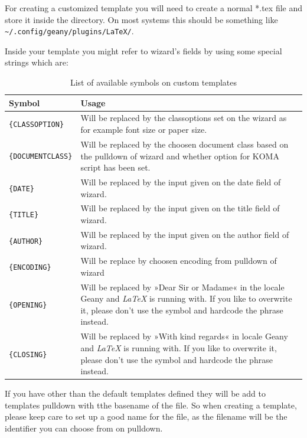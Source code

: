 \documentclass[%
paper=a4,%
fontsize=11pt,%
twoside=false,%
DIV18,%
headsepline,%
plainheadsepline,%
footsepline,%
plainfootsepline,%
bibliography=totoc,%
listof=totoc,%
BCOR10mm,%
parskip=half,%
openany,%
]{scrreprt}
\begin{document}
For creating a customized template you will need to create a normal
*.tex file and store it inside the directory. On most systems this
should be something like
\texttt{\textasciitilde/.config/geany/plugins/LaTeX/}.

Inside your template you might refer to wizard's fields by using some
special strings which are:

\begin{table}[H]
\centering
\label{tab:symbols_in_custom_templates}
\caption{List of available symbols on custom templates}
\begin{tabular}{l|p{10cm}}
\textbf{Symbol} & \textbf{Usage}\\ \hline
\texttt{\{CLASSOPTION\}} & Will be replaced by the classoptions set on
    the wizard as for example font size or paper size.\\
\texttt{\{DOCUMENTCLASS\}} & Will be replaced by the choosen document
    class based on the pulldown of wizard and whether option for KOMA
    script has been set. \\
\texttt{\{DATE\}} & Will be replaced by the input given on the date
    field of wizard.\\
\texttt{\{TITLE\}} & Will be replaced by the input given on the title
    field of wizard.\\
\texttt{\{AUTHOR\} }& Will be replaced by the input given on the author
    field of wizard.\\
\texttt{\{ENCODING\}} & Will be replace by choosen encoding from pulldown
    of wizard\\
\texttt{\{OPENING\}} & Will be replaced by »Dear Sir or Madame« in the
    locale Geany and \textit{LaTeX} is running with. If you like to
    overwrite it, please don't use the symbol and hardcode the phrase
    instead.\\
\texttt{\{CLOSING\}} & Will be replaced by »With kind regards« in locale
    Geany and \textit{LaTeX} is running with. If you like to overwrite it,
    please don't use the symbol and hardcode the phrase instead.\\
    \end{tabular}
\end{table}

If you have other than the default templates defined they will be add
to templates pulldown with tthe basename of the file. So when creating
a template, please keep care to set up a good name for the file, as the
filename will be the identifier you can choose from on pulldown.
\end{document}
